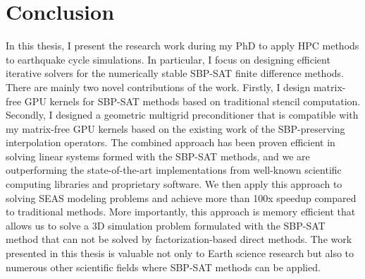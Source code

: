 \section{Conclusion}
In this thesis, I present the research work during my PhD to apply HPC methods to earthquake cycle simulations.
In particular, I focus on designing efficient iterative solvers for the numerically stable SBP-SAT finite difference methods.
There are mainly two novel contributions of the work. Firstly, I design matrix-free GPU kernels for SBP-SAT methods based on traditional stencil computation. Secondly, I designed a geometric multigrid preconditioner that is compatible with my matrix-free GPU kernels based on the existing work of the SBP-preserving interpolation operators.
The combined approach has been proven efficient in solving linear systems formed with the SBP-SAT methods, and we are outperforming the state-of-the-art implementations from well-known scientific computing libraries and proprietary software.
We then apply this approach to solving SEAS modeling problems and achieve more than 100x speedup compared to traditional methods.
More importantly, this approach is memory efficient that allows us to solve a 3D simulation problem formulated with the SBP-SAT method that can not be solved by factorization-based direct methods. 
The work presented in this thesis is valuable not only to Earth science research but also to numerous other scientific fields where SBP-SAT methods can be applied.